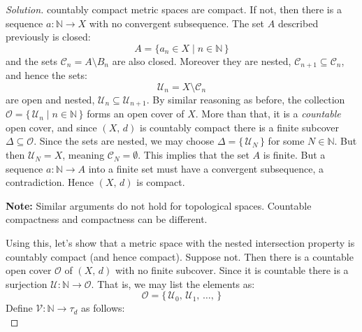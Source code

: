 \documentclass{article}
\theoremstyle{normal}
\begin{document}
\begin{proof}[Solution]
        countably compact metric spaces are compact. If not, then there is a
        sequence $a:\mathbb{N}\rightarrow{X}$ with no convergent
        subsequence. The set $A$ described previously is closed:
        \begin{equation}
            A=\{a_{n}\in{X}\;|\;n\in\mathbb{N}\,\}
        \end{equation}
        and the sets $\mathcal{C}_{n}=A\setminus{B}_{n}$ are also closed.
        Moreover they are nested, $\mathcal{C}_{n+1}\subseteq\mathcal{C}_{n}$,
        and hence the sets:
        \begin{equation}
            \mathcal{U}_{n}=X\setminus\mathcal{C}_{n}
        \end{equation}
        are open and nested, $\mathcal{U}_{n}\subseteq\mathcal{U}_{n+1}$.
        By similar reasoning as before, the collection
        $\mathcal{O}=\{\,\mathcal{U}_{n}\;|\;n\in\mathbb{N}\,\}$ forms an open
        cover of $X$. More than that, it is a \textit{countable} open cover,
        and since $(X,\,d)$ is countably compact there is a finite subcover
        $\Delta\subseteq\mathcal{O}$. Since the sets are nested, we may choose
        $\Delta=\{\,\mathcal{U}_{N}\,\}$ for some $N\in\mathbb{N}$. But then
        $\mathcal{U}_{N}=X$, meaning $\mathcal{C}_{N}=\emptyset$. This implies
        that the set $A$ is finite. But a sequence
        $a:\mathbb{N}\rightarrow{A}$ into a finite set must have a convergent
        subsequence, a contradiction. Hence $(X,\,d)$ is compact.
        \par\hfill\par
        \textbf{Note:} Similar arguments do not hold for topological spaces.
        Countable compactness and compactness can be different.
        \par\hfill\par
        Using this, let's show that a metric space with the nested intersection
        property is countably compact (and hence compact). Suppose not. Then
        there is a countable open cover $\mathcal{O}$ of $(X,\,d)$ with no
        finite subcover. Since it is countable there is a surjection
        $\mathcal{U}:\mathbb{N}\rightarrow\mathcal{O}$. That is, we may list
        the elements as:
        \begin{equation}
            \mathcal{O}=\{\,\mathcal{U}_{0},\,\mathcal{U}_{1},\,\dots,\,\}
        \end{equation}
        Define $\mathcal{V}:\mathbb{N}\rightarrow\tau_{d}$ as follows:
        \begin{equation}

\end{equation}
\end{proof}
\end{document}
